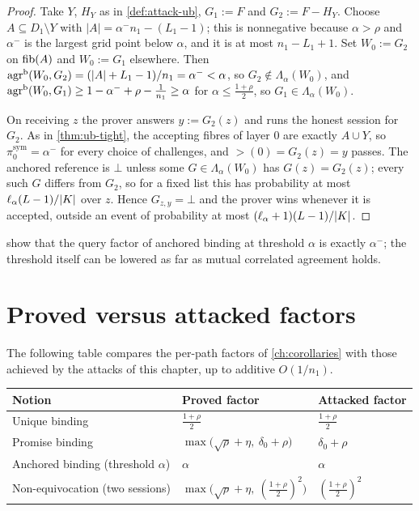 \begin{proof}
Take $Y$, $H_Y$ as in \cref{def:attack-ub}, $G_1:=F$ and $G_2:=F-H_Y$. Choose
$A\subseteq D_1\setminus Y$ with $|A|=\alpha^-n_1-(L_1-1)$; this is nonnegative because
$\alpha>\rho$ and $\alpha^-$ is the largest grid point below $\alpha$, and it is at most
$n_1-L_1+1$. Set $W_0:=G_2$ on $\mathrm{fib}(A)$ and $W_0:=G_1$ elsewhere. Then
$\mathrm{agr}^{\mathrm{b}}(W_0,G_2)=(|A|+L_1-1)/n_1=\alpha^-<\alpha$, so $G_2\notin\Lambda_\alpha(W_0)$, and
$\mathrm{agr}^{\mathrm{b}}(W_0,G_1)\ge1-\alpha^-+\rho-\frac1{n_1}\ge\alpha$ for $\alpha\le\frac{1+\rho}2$, so
$G_1\in\Lambda_\alpha(W_0)$.

On receiving $z$ the prover answers $y:=G_2(z)$ and runs the honest session for $G_2$.
As in \cref{thm:ub-tight}, the accepting fibres of layer $0$ are exactly $A\cup Y$, so
$\pi^{\mathrm{sym}}_0=\alpha^-$ for every choice of challenges, and $\gt(0)=G_2(z)=y$ passes.
The anchored reference is $\bot$ unless some $G\in\Lambda_\alpha(W_0)$ has $G(z)=G_2(z)$;
every such $G$ differs from $G_2$, so for a fixed list this has probability at most
$\ell_\alpha(L-1)/|K|$ over $z$. Hence $G_{z,y}=\bot$ and the prover wins whenever it is
accepted, outside an event of probability at most $(\ell_\alpha+1)(L-1)/|K|$.
\end{proof}

 show that the query factor of anchored binding at
threshold $\alpha$ is exactly $\alpha^-$; the threshold itself can be lowered as far as
mutual correlated agreement holds.

\section{Proved versus attacked factors}

The following table compares the per-path factors of \cref{ch:corollaries} with those
achieved by the attacks of this chapter, up to additive $O(1/n_1)$.

\begin{center}
\renewcommand{\arraystretch}{1.3}
\begin{tabular}{lll}
\hline
Notion & Proved factor & Attacked factor\\
\hline
Unique binding & $\frac{1+\rho}2$ & $\frac{1+\rho}2$\\
Promise binding & $\max\bigl(\sqrt\rho+\eta,\ \delta_0+\rho\bigr)$ & $\delta_0+\rho$\\
Anchored binding (threshold $\alpha$) & $\alpha$ & $\alpha$\\
Non-equivocation (two sessions) & $\max\bigl(\sqrt\rho+\eta,\ (\frac{1+\rho}2)^2\bigr)$ & $(\frac{1+\rho}2)^2$\\
\hline
\end{tabular}
\end{center}

